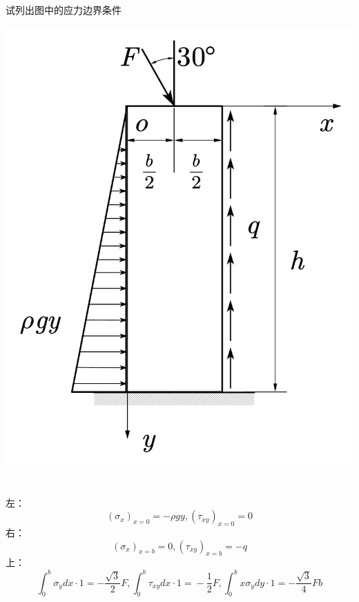 \begin{example}
	试列出图中的应力边界条件
\end{example}
\centerline{\includegraphics[scale=0.5]{figure/2-11.png}}
	\begin{remark}
		\quad\\
		左：\[\left( \sigma _x \right) _{x=0}=-\rho gy,\left( \tau _{xy} \right) _{x=0}=0\]
		右：\[\left( \sigma _x \right) _{x=b}=0,\left( \tau _{xy} \right) _{x=b}=-q\]
		上：\[\int_0^b{\sigma _ydx\cdot 1=-\frac{\sqrt{3}}{2}F,\int_0^b{\tau _{xy}dx\cdot 1}=}-\frac{1}{2}F,\int_0^b{x\sigma _ydy\cdot 1}=-\frac{\sqrt{3}}{4}Fb\]
	\end{remark}

